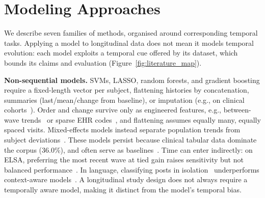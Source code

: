 \documentclass[11pt]{article}
\theoremstyle{plain}
\theoremstyle{definition}
\theoremstyle{remark}
\begin{document}
\section{Modeling Approaches}
\label{sec:modeling}
\label{sec:interplay}
We describe seven families of methods, organised around corresponding temporal tasks. Applying a model to longitudinal data does not mean it models temporal evolution: each model exploits a temporal cue offered by its dataset, which bounds its claims and evaluation (Figure~\ref{fig:literature_map}). 

\noindent\textbf{Non-sequential models.} SVMs, LASSO, random forests, and gradient boosting require a fixed-length vector per subject, flattening histories by concatenation, summaries (last/mean/change from baseline), or imputation (e.g., on clinical cohorts~\citep{9342532,9377173}). %
Order and change survive only as engineered features, e.g., between-wave trends~\citep{9565777} or sparse EHR codes~\citep{9313227}, and flattening assumes equally many, equally spaced visits. Mixed-effects models instead separate population trends from subject deviations~\citep{9098513,9434021}. These models persist because clinical tabular data dominate the corpus (36.0\%), and often serve as baselines~\citep{9629798}. Time can enter indirectly: on ELSA, preferring the most recent wave at tied gain raises sensitivity but not balanced performance~\citep{9308198}. In language, classifying posts in isolation~\citep{bucur-etal-2022-capturing} underperforms context-aware models~\citep{tsakalidis-etal-2022-identifying}. A longitudinal study design does not always require a temporally aware model, making it distinct from the model's temporal bias. %
\end{document}
